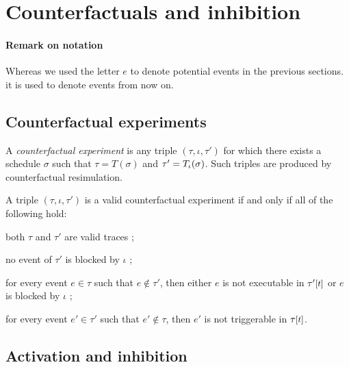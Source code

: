
\section{Counterfactuals and inhibition}\label{sec:inhibition}

\paragraph{Remark on notation} Whereas we used the letter $e$ to denote
potential events in the previous sections. it is used to denote events from
now on.

\subsection{Counterfactual experiments}

A \textit{counterfactual experiment} is any triple
$(\tau, \iota, \tau')$ for which there exists a schedule $\sigma$ such
that $\tau = T(\sigma)$ and $\tau' = {T_\iota}{}(\sigma)$. Such triples
are produced by counterfactual resimulation.

\begin{proposition}%
  \label{prop:valid-cex}
  A triple $(\tau, \iota, \tau')$ is a valid counterfactual experiment if
  and only if all of the following hold:
  \begin{inparaenum}[(1)]
  \item \label{valid-cex:valid-traces} both $\tau$ and $\tau'$ are
    valid traces ;
  \item \label{valid-cex:no-blocking} no event of $\tau'$ is blocked
    by $\iota$ ;
  \item \label{valid-cex:co-occur} for every event $e \in \tau$
    such that $e \notin \tau'$, then either $e$ is not
    executable in $\TSTATE{t}{\tau'}$ or $e$ is blocked by
    $\iota$ ;
  \item \label{valid-cex:co-occur2} for every event $e' \in \tau'$
    such that $e' \notin \tau$, then $e'$ is not triggerable in
    $\TSTATE{t}{\tau}$.
  \end{inparaenum}
\end{proposition}

\subsection{Activation and inhibition}


